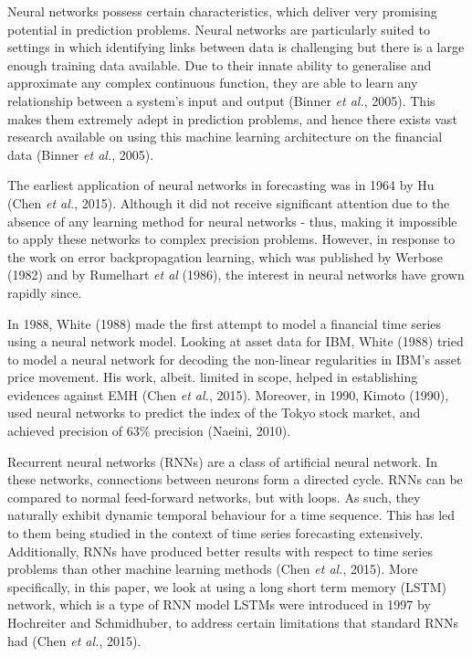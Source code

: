Neural networks possess certain characteristics, which deliver very promising potential in prediction problems. Neural networks are particularly suited to settings in which identifying links between data is challenging but there is a large enough training data available. Due to their innate ability to generalise and approximate any complex continuous function, they are able to learn any relationship between a system's input and output  (Binner \textit{et al.}, 2005). This makes them extremely adept in prediction problems, and hence there exists vast research available on using this machine learning architecture on the financial data  (Binner \textit{et al.}, 2005).

The earliest application of neural networks in forecasting was in 1964 by Hu (Chen \textit{et al.}, 2015). Although it did not receive significant attention due to the absence of any learning method for neural networks - thus, making it impossible to apply these networks to complex precision problems. However, in response to the work on error backpropagation learning, which was published by Werbose (1982) and by Rumelhart \textit{et al} (1986), the interest in neural networks have grown rapidly since.

In 1988, White (1988) made the first attempt to model a financial time series using a neural network model. Looking at asset data for IBM, White (1988) tried to model a neural network for decoding the non-linear regularities in IBM's asset price movement. His work, albeit. limited in scope, helped in establishing evidences against EMH (Chen \textit{et al.}, 2015). Moreover, in 1990, Kimoto  (1990), used neural networks to predict the index of the Tokyo stock market, and achieved precision of 63\% precision (Naeini, 2010).

Recurrent neural networks (RNNs) are a class of artificial neural network. In these networks, connections between neurons form a directed cycle. RNNs can be compared to normal feed-forward networks, but with loops. As such, they naturally exhibit dynamic temporal behaviour for a time sequence. This has led to them being studied in the context of time series forecasting extensively. Additionally, RNNs have produced better results with respect to time series problems than other machine learning methods (Chen \textit{et al.}, 2015). More specifically, in this paper, we look at using a long short term memory (LSTM) network, which is a type of RNN model LSTMs were introduced in 1997 by Hochreiter and Schmidhuber, to address certain limitations that standard RNNs had (Chen \textit{et al.}, 2015). 


